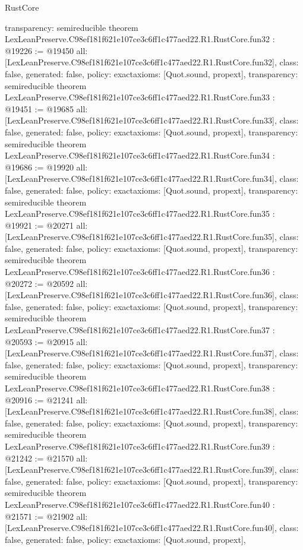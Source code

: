 \begin{lexlean}{RustCore}
\begin{coremodule}
{  transparency: semireducible
}
theorem LexLeanPreserve.C98ef181f621e107ce3c6ff1c477aed22.R1.RustCore.fun32 : @19226 := @19450 {
  all: [LexLeanPreserve.C98ef181f621e107ce3c6ff1c477aed22.R1.RustCore.fun32],
  class: false,
  generated: false,
  policy: exact{axioms: [Quot.sound, propext]},
  transparency: semireducible
}
theorem LexLeanPreserve.C98ef181f621e107ce3c6ff1c477aed22.R1.RustCore.fun33 : @19451 := @19685 {
  all: [LexLeanPreserve.C98ef181f621e107ce3c6ff1c477aed22.R1.RustCore.fun33],
  class: false,
  generated: false,
  policy: exact{axioms: [Quot.sound, propext]},
  transparency: semireducible
}
theorem LexLeanPreserve.C98ef181f621e107ce3c6ff1c477aed22.R1.RustCore.fun34 : @19686 := @19920 {
  all: [LexLeanPreserve.C98ef181f621e107ce3c6ff1c477aed22.R1.RustCore.fun34],
  class: false,
  generated: false,
  policy: exact{axioms: [Quot.sound, propext]},
  transparency: semireducible
}
theorem LexLeanPreserve.C98ef181f621e107ce3c6ff1c477aed22.R1.RustCore.fun35 : @19921 := @20271 {
  all: [LexLeanPreserve.C98ef181f621e107ce3c6ff1c477aed22.R1.RustCore.fun35],
  class: false,
  generated: false,
  policy: exact{axioms: [Quot.sound, propext]},
  transparency: semireducible
}
theorem LexLeanPreserve.C98ef181f621e107ce3c6ff1c477aed22.R1.RustCore.fun36 : @20272 := @20592 {
  all: [LexLeanPreserve.C98ef181f621e107ce3c6ff1c477aed22.R1.RustCore.fun36],
  class: false,
  generated: false,
  policy: exact{axioms: [Quot.sound, propext]},
  transparency: semireducible
}
theorem LexLeanPreserve.C98ef181f621e107ce3c6ff1c477aed22.R1.RustCore.fun37 : @20593 := @20915 {
  all: [LexLeanPreserve.C98ef181f621e107ce3c6ff1c477aed22.R1.RustCore.fun37],
  class: false,
  generated: false,
  policy: exact{axioms: [Quot.sound, propext]},
  transparency: semireducible
}
theorem LexLeanPreserve.C98ef181f621e107ce3c6ff1c477aed22.R1.RustCore.fun38 : @20916 := @21241 {
  all: [LexLeanPreserve.C98ef181f621e107ce3c6ff1c477aed22.R1.RustCore.fun38],
  class: false,
  generated: false,
  policy: exact{axioms: [Quot.sound, propext]},
  transparency: semireducible
}
theorem LexLeanPreserve.C98ef181f621e107ce3c6ff1c477aed22.R1.RustCore.fun39 : @21242 := @21570 {
  all: [LexLeanPreserve.C98ef181f621e107ce3c6ff1c477aed22.R1.RustCore.fun39],
  class: false,
  generated: false,
  policy: exact{axioms: [Quot.sound, propext]},
  transparency: semireducible
}
theorem LexLeanPreserve.C98ef181f621e107ce3c6ff1c477aed22.R1.RustCore.fun40 : @21571 := @21902 {
  all: [LexLeanPreserve.C98ef181f621e107ce3c6ff1c477aed22.R1.RustCore.fun40],
  class: false,
  generated: false,
  policy: exact{axioms: [Quot.sound, propext]},
}
\end{coremodule}
\end{lexlean}
